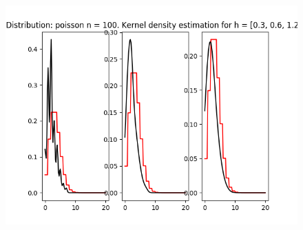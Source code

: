 \documentclass[12pt]{report}
\begin{document}
\begin{center}
\begin{figure}[H]
\includegraphics[width=\textwidth]{../lab_4/pic/kernel/d_poisson100.png}
\end{figure}


\end{center}
\end{document}
